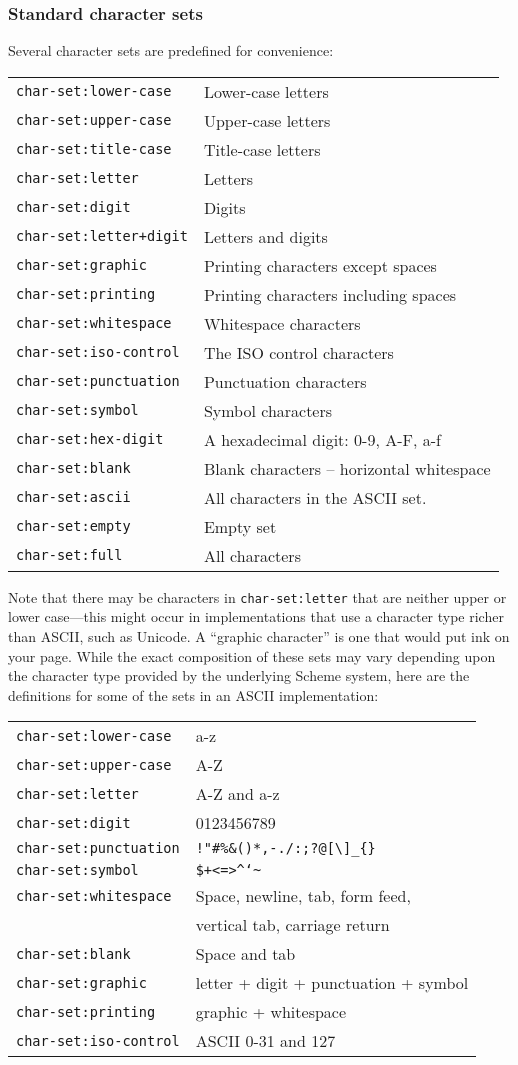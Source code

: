 \subsubsection{Standard character sets}


Several character sets are predefined for convenience: 

\begin{tabular}{ll}
\texttt{char-set:lower-case} & Lower-case letters\tabularnewline
\texttt{char-set:upper-case} & Upper-case letters\tabularnewline
\texttt{char-set:title-case} & Title-case letters\tabularnewline
\texttt{char-set:letter} & Letters\tabularnewline
\texttt{char-set:digit} & Digits\tabularnewline
\texttt{char-set:letter+digit} & Letters and digits\tabularnewline
\texttt{char-set:graphic} & Printing characters except
spaces\tabularnewline
\texttt{char-set:printing} & Printing characters including
spaces\tabularnewline
\texttt{char-set:whitespace} & Whitespace characters\tabularnewline
\texttt{char-set:iso-control} & The ISO control
characters\tabularnewline
\texttt{char-set:punctuation} & Punctuation characters\tabularnewline
\texttt{char-set:symbol} & Symbol characters\tabularnewline
\texttt{char-set:hex-digit} & A hexadecimal digit: 0-9, A-F,
a-f\tabularnewline
\texttt{char-set:blank} & Blank characters -- horizontal
whitespace\tabularnewline
\texttt{char-set:ascii} & All characters in the ASCII
set.\tabularnewline
\texttt{char-set:empty} & Empty set\tabularnewline
\texttt{char-set:full} & All characters\tabularnewline
\end{tabular}

Note that there may be characters in \texttt{char-set:letter} that are
neither upper or lower case---this might occur in implementations that
use a character type richer than ASCII, such as Unicode. A ``graphic
character'' is one that would put ink on your page. While the exact
composition of these sets may vary depending upon the character type
provided by the underlying Scheme system, here are the definitions for
some of the sets in an ASCII implementation:

\begin{tabular}{ll}
\texttt{char-set:lower-case} & a-z\tabularnewline
\texttt{char-set:upper-case} & A-Z\tabularnewline
\texttt{char-set:letter} & A-Z and a-z\tabularnewline
\texttt{char-set:digit} & 0123456789\tabularnewline
\texttt{char-set:punctuation} &
\texttt{!"\#\%\&\textquotesingle{}()*,-./:;?@{[}\textbackslash{}{]}\_\{\}}\tabularnewline
\texttt{char-set:symbol} &
\texttt{\$+<=\textgreater{}\^{}`\textbar{}\textasciitilde{}}\tabularnewline
\texttt{char-set:whitespace} & Space, newline, tab, form
feed,\tabularnewline
& vertical tab, carriage return\tabularnewline
\texttt{char-set:blank} & Space and tab\tabularnewline
\texttt{char-set:graphic} & letter + digit + punctuation +
symbol\tabularnewline
\texttt{char-set:printing} & graphic + whitespace\tabularnewline
\texttt{char-set:iso-control} & ASCII 0-31 and 127\tabularnewline
\end{tabular}

